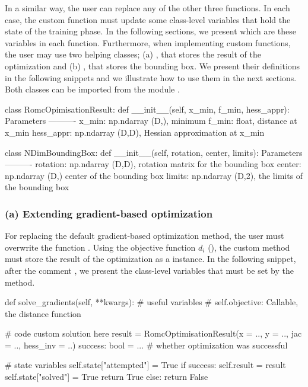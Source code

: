 \documentclass[article, shortnames]{jss}
\begin{document}
In a similar way, the user can replace any of the other three
functions. In each case, the custom function must update some
class-level variables that hold the state of the training phase. In
the following sections, we present which are these variables in each
function. Furthermore, when implementing custom functions, the user
may use two helping classes; (a) , that
stores the result of the optimization and (b) ,
that stores the bounding box. We present their definitions in the
following snippets and we illustrate how to use them in the next
sections. Both classes can be imported from the module
.


\begin{Code}
class RomcOpimisationResult:
    def __init__(self, x_min, f_min, hess_appr):
        Parameters
        ----------
        x_min: np.ndarray (D,), minimum
        f_min: float, distance at x_min
        hess_appr: np.ndarray (D,D), Hessian approximation at x_min

class NDimBoundingBox:
    def __init__(self, rotation, center, limits):
        Parameters
        ----------
        rotation: np.ndarray (D,D), rotation matrix for the bounding box
        center: np.ndarray (D,) center of the bounding box
        limits: np.ndarray (D,2), the limits of the bounding box
\end{Code}

\subsubsection*{(a) Extending gradient-based optimization}

For replacing the default gradient-based optimization method, the user
must overwrite the function . Using the
objective function \(d_i\) (), the custom method
must store the result of the optimization as a
 instance. In the following snippet,
after the comment , we present the
class-level variables that must be set by the method.

\begin{Code}
def solve_gradients(self, **kwargs):
    # useful variables
    # self.objective: Callable, the distance function

    # code custom solution here
    result = RomcOptimisationResult(x = .., y = .., jac = .., hess_inv = ..)
    success: bool = ... # whether optimization was successful

    # state variables
    self.state["attempted"] = True
    if success:
        self.result = result
        self.state["solved"] = True
        return True
    else:
        return False
\end{Code}
\end{document}
